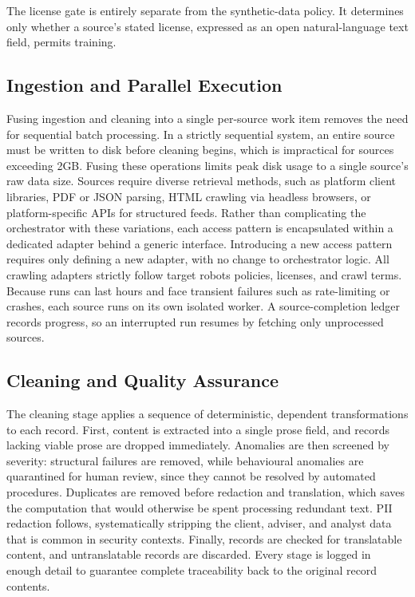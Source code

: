 \documentclass[conference]{IEEEtran}
\begin{document}
The license gate is entirely separate from the synthetic-data policy. It determines only whether a source's stated license, expressed as an open natural-language text field, permits training.

\subsection{Ingestion and Parallel Execution}

Fusing ingestion and cleaning into a single per-source work item removes the need for sequential batch processing. In a strictly sequential system, an entire source must be written to disk before cleaning begins, which is impractical for sources exceeding 2GB. Fusing these operations limits peak disk usage to a single source's raw data size. Sources require diverse retrieval methods, such as platform client libraries, PDF or JSON parsing, HTML crawling via headless browsers, or platform-specific APIs for structured feeds. Rather than complicating the orchestrator with these variations, each access pattern is encapsulated within a dedicated adapter behind a generic interface. Introducing a new access pattern requires only defining a new adapter, with no change to orchestrator logic. All crawling adapters strictly follow target robots policies, licenses, and crawl terms. Because runs can last hours and face transient failures such as rate-limiting or crashes, each source runs on its own isolated worker. A source-completion ledger records progress, so an interrupted run resumes by fetching only unprocessed sources.

\subsection{Cleaning and Quality Assurance}

The cleaning stage applies a sequence of deterministic, dependent transformations to each record. First, content is extracted into a single prose field, and records lacking viable prose are dropped immediately. Anomalies are then screened by severity: structural failures are removed, while behavioural anomalies are quarantined for human review, since they cannot be resolved by automated procedures. Duplicates are removed before redaction and translation, which saves the computation that would otherwise be spent processing redundant text. PII redaction follows, systematically stripping the client, adviser, and analyst data that is common in security contexts. Finally, records are checked for translatable content, and untranslatable records are discarded. Every stage is logged in enough detail to guarantee complete traceability back to the original record contents.
\end{document}
